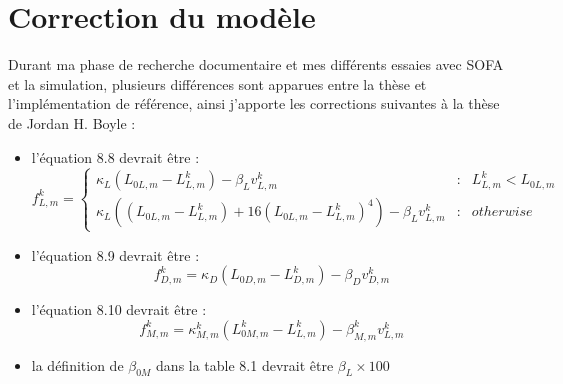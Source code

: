 \cleardoublepage
\chapter{Correction du modèle} %
\label{cha:Correction du modèle}

Durant ma phase de recherche documentaire et mes différents essaies avec
SOFA et la simulation, plusieurs différences sont apparues entre la thèse
et l'implémentation de référence, ainsi j'apporte les corrections suivantes
à la thèse de Jordan H. Boyle \cite{Boyle2009} :
\begin{itemize}
   \item l'équation 8.8 devrait être :
      \begin{equation}
      f^k_{L,m} = \left\{ 
         \begin{array}{rcl}
            \kappa_L(L_{0L,m} - L_{L,m}^k) - \beta_{L}v_{L,m}^k & : & L_{L,m}^k < L_{0L,m}\\
            \kappa_L((L_{0L,m} - L_{L,m}^k) + 16(L_{0L,m} - L_{L,m}^k)^4) - \beta_{L}v_{L,m}^k & : & otherwise
         \end{array}
         \right.
      \end{equation}
   \item l'équation 8.9 devrait être :
      \begin{equation}
      f_{D,m}^k = \kappa_D(L_{0D,m} - L_{D,m}^k) - \beta_{D}v_{D,m}^k
      \end{equation}
   \item l'équation 8.10 devrait être :
      \begin{equation}
      f_{M,m}^k = \kappa_{M,m}^k(L_{0M,m}^k - L_{L,m}^k) - \beta_{M,m}^{k}v_{L,m}^k
      \end{equation}
   \item la définition de $\beta_{0M}$ dans la table 8.1 devrait être $\beta_L \times 100$
\end{itemize}



